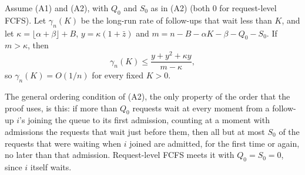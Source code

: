 \begin{lemma}\label{lem:waits}
Assume (A1) and (A2), with $Q_0$ and $S_0$ as in (A2) (both 0 for request-level FCFS). Let $\gamma_n(K)$ be the long-run rate of follow-ups that wait less than $K$, and let $\kappa=\lfloor\alpha+\beta\rfloor+B$, $y=\kappa(1+\bar z)$ and $m=n-B-\alpha K-\beta-Q_0-S_0$. If $m>\kappa$, then
\[
\gamma_n(K)\le\frac{y+y^2+\kappa y}{m-\kappa},
\]
so $\gamma_n(K)=O(1/n)$ for every fixed $K>0$.
\end{lemma}

\noindent The general ordering condition of (A2), the only property of the order that the proof uses, is this: if more than $Q_0$ requests wait at every moment from a follow-up $i$'s joining the queue to its first admission, counting at a moment with admissions the requests that wait just before them, then all but at most $S_0$ of the requests that were waiting when $i$ joined are admitted, for the first time or again, no later than that admission. Request-level FCFS meets it with $Q_0=S_0=0$, since $i$ itself waits.

